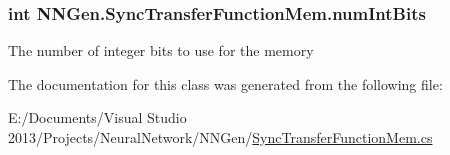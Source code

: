 \subsubsection[{num\+Int\+Bits}]{\setlength{\rightskip}{0pt plus 5cm}int N\+N\+Gen.\+Sync\+Transfer\+Function\+Mem.\+num\+Int\+Bits\hspace{0.3cm}{\ttfamily [get]}}\label{class_n_n_gen_1_1_sync_transfer_function_mem_ac004657938e8276bfcaf430399237501}


The number of integer bits to use for the memory 



The documentation for this class was generated from the following file\+:\begin{DoxyCompactItemize}
\item 
E\+:/\+Documents/\+Visual Studio 2013/\+Projects/\+Neural\+Network/\+N\+N\+Gen/\hyperlink{_sync_transfer_function_mem_8cs}{Sync\+Transfer\+Function\+Mem.\+cs}\end{DoxyCompactItemize}
